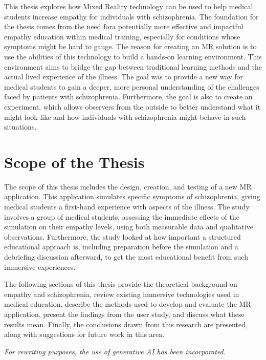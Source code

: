 \vspace{1em}

This thesis explores how Mixed Reality technology can be used to help medical students increase empathy for individuals with schizophrenia. The foundation for the thesis comes from the need fora potentially more effective and impactful empathy education within medical training, especially for conditions whose symptoms might be hard to gauge. The reason for creating an MR solution is to use the abilities of this technology to build a hands-on learning environment. This environment aims to bridge the gap between traditional learning methods and the actual lived experience of the illness. The goal was to provide a new way for medical students to gain a deeper, more personal understanding of the challenges faced by patients with schizophrenia. Furthermore, the goal is also to create an experiment, which allows observers from the outside to better understand what it might look like and how individuals with schizophrenia might behave in such situations.

\section{Scope of the Thesis}

The scope of this thesis includes the design, creation, and testing of a new MR application. This application simulates specific symptoms of schizophrenia, giving medical students a first-hand experience with aspects of the illness. The study involves a group of medical students, assessing the immediate effects of the simulation on their empathy levels, using both measurable data and qualitative observations. Furthermore, the study looked at how important a structured educational approach is, including preparation before the simulation and a debriefing discussion afterward, to get the most educational benefit from such immersive experiences. 

\vspace{1em}

The following sections of this thesis provide the theoretical background on empathy and schizophrenia, review existing immersive technologies used in medical education, describe the methods used to develop and evaluate the MR application, present the findings from the user study, and discuss what these results mean. Finally, the conclusions drawn from this research are presented, along with suggestions for future work in this area.

\bigskip
\noindent
\textit{For rewriting purposes, the use of generative AI has been incorporated.}